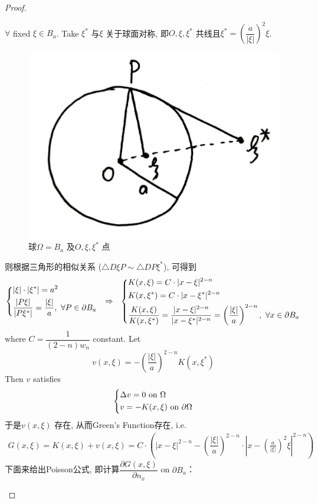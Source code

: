 \begin{thm}
\begin{proof}
\begin{enumerate}
				\vspace*{1em}
				
				$\forall$ fixed $\xi \in B_a$. Take $\xi^*$ 与$\xi$ 关于球面对称, 即$O, \xi , \xi^*$ 共线且$\xi^* = \left( \dfrac{a}{| \xi |} \right)^2 \xi$. 
				
				\begin{figure}[thbp!]
					\centering
					\includegraphics[width=0.3\linewidth]{figure/3.5-1}
					\caption{球$\Omega = B_a$ 及$O, \xi , \xi^*$ 点}
					\label{pic : 3.5-1} %
				\end{figure}
				
				则根据三角形的相似关系 ($\triangle D \xi P \sim \triangle DP\xi^*$), 可得到
				\begin{align*}
					\begin{dcases*}
						| \xi | \cdot | \xi^* | = a^2 \\
						\frac{| P\xi |}{| P \xi^* |} = \frac{| \xi |}{a} , \,\, \forall P \in \partial B_a
					\end{dcases*} 
					\,\,\,\, \Rightarrow \,\,\,\, 
					\begin{dcases*}
						K(x , \xi) = C \cdot | x - \xi |^{2 - n} \\
						K(x , \xi^*) = C \cdot | x - \xi^* |^{2 - n} \\
						\frac{K(x , \xi)}{K(x , \xi^*)} 
						= \frac{| x - \xi|^{2 - n}}{| x - \xi^* |^{2 - n}} 
						= \left( \frac{| \xi |}{a} \right)^{2 - n} , \,\, \forall x \in \partial B_a
					\end{dcases*}
				\end{align*}
				where $C = \dfrac{1}{(2 - n) w_n}$ constant. Let
				\[ v(x , \xi) = -\left( \dfrac{| \xi |}{a} \right)^{2 - n} K(x , \xi^*) \]
				Then $v$ satisfies
				\begin{align*}
					\begin{dcases*}
						\Delta v = 0 \,\, \text{on} \,\, \Omega \\
						v = -K(x , \xi) \,\, \text{on} \,\, \partial \Omega
					\end{dcases*}
				\end{align*}
				于是$v(x , \xi)$ 存在, 从而Green's Function存在, i.e. 
				\begin{align*}
					G(x , \xi) 
					= K(x , \xi) + v(x , \xi) 
					= C \cdot \left( | x - \xi |^{2 - n} - \left( \dfrac{| \xi |}{a} \right)^{2 - n} \cdot \left| x - \left( \frac{a}{| \xi |} \right)^2 \xi \right|^{2 - n} \right)
				\end{align*}
				下面来给出Poisson公式, 即计算$\dfrac{\partial G(x , \xi)}{\partial n_x}$ on $\partial B_a$：
				

\end{enumerate}
\end{proof}
\end{thm}

